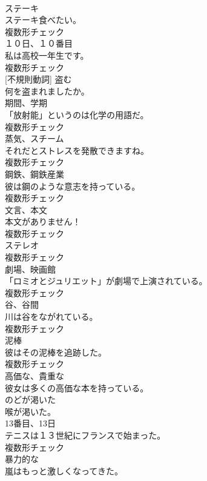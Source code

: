 \documentclass[8pt]{extreport}
\begin{document}
\begin{CJK}{UTF8}{min}
\\	[名詞]	ステーキ	
\\	ステーキ食べたい。	
\\	複数形チェック
\\	[名詞]	１０日、１０番目	
\\	私は高校一年生です。	
\\	複数形チェック
\\	[動詞] [不規則動詞]	盗む	
\\	何を盗まれましたか。	
\\	[名詞]	期間、学期	
\\	「放射能」というのは化学の用語だ。	
\\	複数形チェック
\\	[名詞]	蒸気、スチーム	
\\	それだとストレスを発散できますね。	
\\	複数形チェック
\\	[名詞]	鋼鉄、鋼鉄産業	
\\	彼は鋼のような意志を持っている。	
\\	複数形チェック
\\	[名詞]	文言、本文	
\\	本文がありません！	
\\	複数形チェック
\\	[名詞]	ステレオ	
\\	複数形チェック
\\	[名詞]	劇場、映画館	
\\	「ロミオとジュリエット」が劇場で上演されている。	
\\	複数形チェック
\\	[名詞]	谷、谷間	
\\	川は谷をながれている。	
\\	複数形チェック
\\	[名詞]	泥棒	
\\	彼はその泥棒を追跡した。	
\\	複数形チェック
\\	[形容詞]	高価な、貴重な	
\\	彼女は多くの高価な本を持っている。	
\\	[形容詞]	のどが渇いた	
\\	喉が渇いた。	
\\	[名詞]	13番目、13日	
\\	テニスは１３世紀にフランスで始まった。	
\\	複数形チェック
\\	[形容詞]	暴力的な	
\\	嵐はもっと激しくなってきた。	

\end{CJK}
\end{document}

